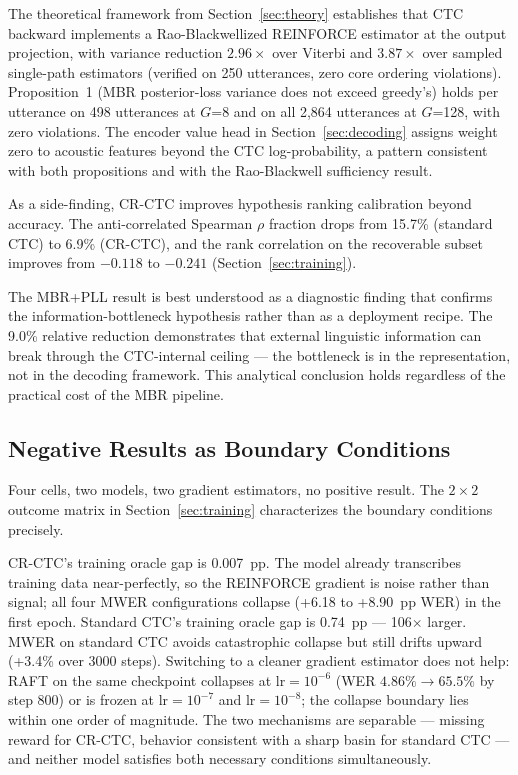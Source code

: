 The theoretical framework from Section~\ref{sec:theory} establishes that CTC backward implements a Rao-Blackwellized REINFORCE estimator at the output projection, with variance reduction $2.96\times$ over Viterbi and $3.87\times$ over sampled single-path estimators (verified on 250 utterances, zero core ordering violations). Proposition~1 (MBR posterior-loss variance does not exceed greedy's) holds per utterance on 498 utterances at $G$=8 and on all 2{,}864 utterances at $G$=128, with zero violations. The encoder value head in Section~\ref{sec:decoding} assigns weight zero to acoustic features beyond the CTC log-probability, a pattern consistent with both propositions and with the Rao-Blackwell sufficiency result.

As a side-finding, CR-CTC improves hypothesis ranking calibration beyond accuracy. The anti-correlated Spearman $\rho$ fraction drops from 15.7\% (standard CTC) to 6.9\% (CR-CTC), and the rank correlation on the recoverable subset improves from $-0.118$ to $-0.241$ (Section~\ref{sec:training}).

The MBR+PLL result is best understood as a diagnostic finding that confirms the information-bottleneck hypothesis rather than as a deployment recipe. The 9.0\% relative reduction demonstrates that external linguistic information can break through the CTC-internal ceiling — the bottleneck is in the representation, not in the decoding framework. This analytical conclusion holds regardless of the practical cost of the MBR pipeline.



\subsection{Negative Results as Boundary Conditions}

Four cells, two models, two gradient estimators, no positive result. The $2\times2$ outcome matrix in Section~\ref{sec:training} characterizes the boundary conditions precisely.

CR-CTC's training oracle gap is 0.007~pp. The model already transcribes training data near-perfectly, so the REINFORCE gradient is noise rather than signal; all four MWER configurations collapse (+6.18 to +8.90~pp WER) in the first epoch. Standard CTC's training oracle gap is 0.74~pp — 106$\times$ larger. MWER on standard CTC avoids catastrophic collapse but still drifts upward (+3.4\% over 3000 steps). Switching to a cleaner gradient estimator does not help: RAFT on the same checkpoint collapses at lr$=10^{-6}$ (WER $4.86\% \to 65.5\%$ by step 800) or is frozen at lr$=10^{-7}$ and lr$=10^{-8}$; the collapse boundary lies within one order of magnitude. The two mechanisms are separable — missing reward for CR-CTC, behavior consistent with a sharp basin for standard CTC — and neither model satisfies both necessary conditions simultaneously.

